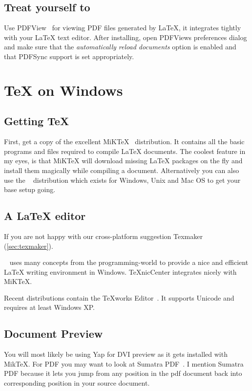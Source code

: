 \subsection{Treat yourself to }

Use PDFView~\cite{pdfview} for viewing PDF files generated by \LaTeX{}, it integrates tightly
with your \LaTeX{} text editor. After installing, open
PDFViews preferences dialog and make sure that the \emph{automatically reload
  documents} option is enabled and that PDFSync support is set appropriately.

\section{\TeX{} on Windows}

\subsection{Getting \TeX{}}

First, get a copy of the excellent MiK\TeX{}~\cite{miktex} distribution.
It contains all the basic programs and files
required to compile \LaTeX{} documents.  The coolest feature in my eyes, is
that MiK\TeX{} will download missing \LaTeX{} packages on the fly and install them
magically while compiling a document. Alternatively you can also use
the \TeXLive~\cite{texlive} distribution which exists for Windows, Unix and Mac OS to
get your base setup going.

\subsection{A \LaTeX{} editor}

If you are not happy with our cross-platform suggestion Texmaker
(\autoref{sec:texmaker}).

~\cite{texniccenter} uses many concepts from the programming-world to provide a nice and
efficient \LaTeX{} writing environment in Windows. TeXnicCenter integrates nicely with
MiKTeX.

Recent \TeXLive{} distributions contain the \TeX{}works Editor~\cite{texworks}.
It supports Unicode and requires at least Windows XP\@.

\subsection{Document Preview}

You will most likely be using Yap for DVI preview as it gets installed with
MikTeX. For PDF you may want to look at Sumatra
PDF~\cite{sumatrapdf}. I mention Sumatra PDF
because it lets you jump from any position in the pdf document back into
corresponding position in your source document.

